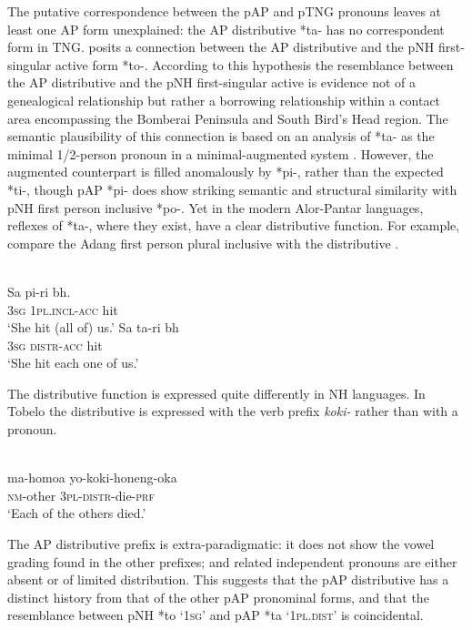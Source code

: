 The putative correspondence between the pAP and pTNG pronouns leaves at least one AP form unexplained: the AP distributive *ta- has no correspondent form in TNG. \citet{Donohue2008boundpron} posits a connection between the AP distributive and the pNH first-singular active form *to-. According to this hypothesis the resemblance between the AP distributive and the pNH first-singular active is evidence not of a genealogical relationship but rather a borrowing relationship within a contact area encompassing the Bomberai Peninsula and South Bird's Head region. The semantic plausibility of this connection is based on an analysis of *ta- as the minimal 1/2-person pronoun in a minimal-augmented system \citep{Donohue2007phonological}. However, the augmented counterpart is filled anomalously by *pi-, rather than the expected *ti-, though pAP *pi- does show striking semantic and structural similarity with pNH first person inclusive *po-. Yet in the modern Alor-Pantar languages, reflexes of *ta-, where they exist, have a clear distributive 
function. For example, compare the Adang first person plural inclusive  with the distributive .


\ea%
\label{ex:4:33}
 \\
\ea\label{ex:4:33a}
\gll Sa pi-ri b{\textepsilon}h. \\
    \textsc{3sg} \textsc{1pl.incl-acc} hit \\
\glt `She hit (all of) us.' 
  \ex \label{ex:4:33b}
  \gll Sa ta-ri b{\textepsilon}h \\
  \textsc{3sg} \textsc{distr-acc} hit \\
\glt `She hit each one of us.'
  \z
\z

The distributive function is expressed quite differently in NH languages. In Tobelo the distributive is expressed with the verb prefix \textit{koki-}  rather than with a pronoun.


\ea%
\label{ex:4:34}
 \\
\gll  ma-homoa yo-koki-honeng-oka  \\
   \textsc{nm}-other \textsc{3pl-distr}-die-\textsc{prf} \\
\glt `Each of the others died.'
\z





The AP distributive prefix is extra-paradigmatic: it does not show the vowel grading found in the other prefixes; and  related independent pronouns are either absent or of limited distribution. This suggests that the pAP distributive has a distinct history from that of the other pAP pronominal forms, and that the resemblance between pNH *to `\textsc{1sg}' and pAP *ta `\textsc{1pl.dist}' is coincidental.

